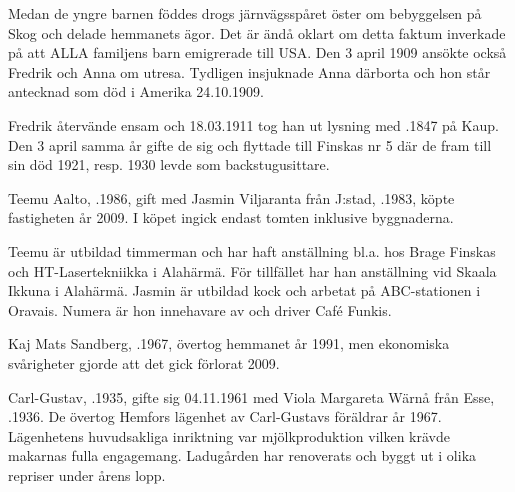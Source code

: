 Medan de yngre barnen föddes drogs järnvägsspåret öster om bebyggelsen på Skog och delade hemmanets ägor. Det är ändå oklart om detta faktum inverkade på att ALLA familjens barn emigrerade till USA. Den 3 april 1909 ansökte också Fredrik och Anna om utresa. Tydligen insjuknade Anna därborta och hon står antecknad som död i Amerika 24.10.1909.

Fredrik återvände ensam och 18.03.1911 tog han ut lysning med  .1847 på Kaup. Den 3 april samma år gifte de sig och flyttade till Finskas nr 5 där de fram till sin död 1921, resp. 1930 levde som backstugusittare.






Teemu Aalto, .1986, gift med Jasmin Viljaranta från J:stad, .1983, köpte fastigheten år 2009. I köpet ingick endast tomten inklusive byggnaderna.

Teemu är utbildad timmerman och har haft anställning bl.a. hos Brage Finskas och HT-Lasertekniikka i Alahärmä. För tillfället har han anställning vid Skaala Ikkuna i Alahärmä. Jasmin är utbildad kock och arbetat på ABC-stationen i Oravais. Numera är hon innehavare av och driver Café Funkis.
\begin{jhchildren}
  \item {}
  \item {}
  \item {}
\end{jhchildren}


Kaj Mats Sandberg,  .1967, övertog hemmanet år 1991, men ekonomiska svårigheter gjorde att det gick förlorat 2009.\jhvspace{}


Carl-Gustav, .1935, gifte sig 04.11.1961 med Viola Margareta Wärnå från Esse, .1936. De övertog Hemfors lägenhet av Carl-Gustavs föräldrar år 1967. Lägenhetens huvudsakliga inriktning var mjölkproduktion vilken krävde makarnas fulla engagemang. Ladugården har renoverats och byggt ut i olika repriser under årens lopp.

